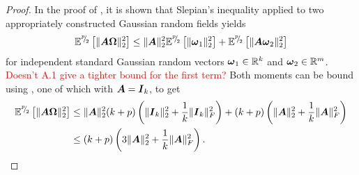 \begin{proof}
    In the proof of \cite[Lemma B.1]{tropp-2023-randomized-algorithms}, it is shown that Slepian's inequality \cite[Theorem 7.2.1]{vershynin-2018-highdimensional-probability} applied to two appropriately constructed Gaussian random fields yields
    \begin{equation}
        \mathbb{E}^{{}^{p}{\mskip -5mu/\mskip -3mu}_{2}}\left[ \lVert \boldsymbol{A} \boldsymbol{\Omega} \rVert _2^2 \right]
        \leq \lVert \boldsymbol{A} \rVert _2^2 \mathbb{E}^{{}^{p}{\mskip -5mu/\mskip -3mu}_{2}}\left[ \lVert \boldsymbol{\omega}_1 \rVert _2^2 \right] + \mathbb{E}^{{}^{p}{\mskip -5mu/\mskip -3mu}_{2}}\left[ \lVert \boldsymbol{A} \boldsymbol{\omega}_2 \rVert _2^2 \right]
    \end{equation}
    for independent standard Gaussian random vectors $\boldsymbol{\omega}_1 \in \mathbb{R}^{k}$ and $\boldsymbol{\omega}_2 \in \mathbb{R}^{m}$. \textcolor{red}{Doesn't A.1 give a tighter bound for the first term?} Both moments can be bound using , one of which with $\boldsymbol{A} = \boldsymbol{I}_k$, to get
    \begin{align}
        \mathbb{E}^{{}^{p}{\mskip -5mu/\mskip -3mu}_{2}}\left[ \lVert \boldsymbol{A} \boldsymbol{\Omega} \rVert _2^2 \right]
        &\leq \lVert \boldsymbol{A} \rVert _2^2 (k + p) \left( \lVert \boldsymbol{I}_k \rVert _2^2 + \frac{1}{k} \lVert \boldsymbol{I}_k \rVert _F^2 \right) + (k + p) \left( \lVert \boldsymbol{A} \rVert _2^2 + \frac{1}{k} \lVert \boldsymbol{A} \rVert _F^2 \right) \notag \\
        &\leq (k + p) \left( 3 \lVert \boldsymbol{A} \rVert _2^2 + \frac{1}{k} \lVert \boldsymbol{A} \rVert _F^2 \right).
    \end{align}


\end{proof}

